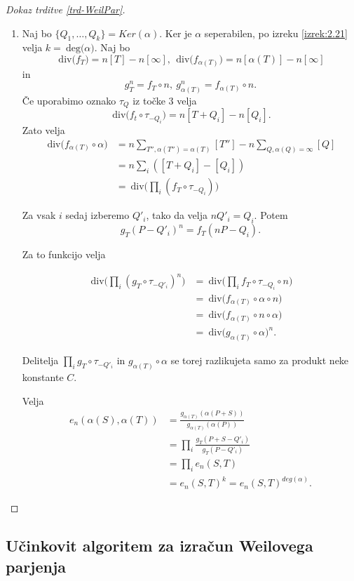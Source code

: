 \documentclass[12pt,a4paper,twoside]{article}
\theoremstyle{definition} %
\theoremstyle{plain} %
\numberwithin{equation}{section}  %
\newcommand{\DEG}[1]{\ \text{deg(}{#1}\text{)}}
\newcommand{\Div}[1]{\ \text{div(}{#1}\text{)}}
\begin{document}
\begin{proof}[Dokaz trditve \ref{trd-WeilPar}]
\begin{enumerate}
\item Naj bo $\{Q_1,\ldots,Q_k\} = Ker(\alpha)$. Ker je $\alpha$ seperabilen, po izreku \ref{izrek:2.21} velja $k = \DEG{\alpha}$.
Naj bo
$$\Div{f_T} = n[T]-n[\infty],\ \Div{f_{\alpha(T)}} = n[\alpha(T)]-n[\infty]$$
in
$$g^n_T = f_T \circ n, \ g^n_{\alpha(T)} = f_{\alpha(T)} \circ n.$$
Če uporabimo oznako $\tau_Q$ iz točke $3$ velja
$$\Div{f_t \circ \tau_{-Q_i}} = n[T+Q_i]-n[Q_i].$$
Zato velja
\begin{align}
\Div{ f_{\alpha(T)} \circ \alpha} &{}= n \sum_{T'',\alpha(T'')=\alpha(T)}[T'']-n\sum_{Q,\alpha(Q)=\infty}[Q] \nonumber \\
&{} = n\sum_i ([T+Q_i]-[Q_i]) \nonumber \\
&{} = \Div{\prod_i(f_T \circ \tau_{-Q_i})} \nonumber
\end{align}

Za vsak $i$ sedaj izberemo $Q'_i$, tako da velja $nQ'_i = Q_i$. Potem
$$g_T(P-Q'_i)^n=f_T(nP-Q_i).$$

Za to funkcijo velja

\begin{align}
\Div{\prod_i(g_T \circ \tau_{-Q'_i})^n} &{} = \Div{\prod_i f_T \circ \tau_{-Q_i}\circ n} \nonumber \\
&{} = \Div{f_{\alpha(T)} \circ \alpha \circ n} \nonumber \\
&{} = \Div{f_{\alpha(T)} \circ n \circ \alpha} \nonumber \\
&{} = \Div{g_{\alpha(T)} \circ \alpha}^n. \nonumber
\end{align}

Delitelja $\prod_i g_T \circ \tau_{-Q'_i}$ in $g_{\alpha(T)} \circ \alpha$ se torej razlikujeta samo za produkt neke konstante $C$.

Velja
\begin{align}
e_n(\alpha(S),\alpha(T)) &{}= \frac{g_{\alpha(T)}(\alpha(P+S))}{g_{\alpha(T)}(\alpha(P))} \nonumber \\
&{} = \prod_i \frac{g_T(P+S-Q'_i)}{g_T(P-Q'_i)} \nonumber \\
&{} = \prod_i e_n(S,T) \nonumber  \\
&{} = e_n(S,T)^k = e_n(S,T)^{deg(\alpha)}. \nonumber
\end{align}

\end{enumerate}

\end{proof}

\subsection{Učinkovit algoritem za izračun Weilovega parjenja}
\end{document}
